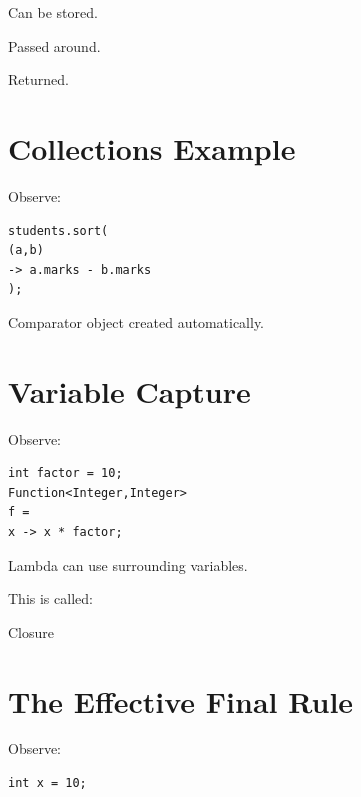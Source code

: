 \documentclass[11pt,a4paper]{book}
\begin{document}
Can be stored.


Passed around.


Returned.


\section{Collections Example}

Observe:

\begin{verbatim} 
students.sort(
(a,b)
-> a.marks - b.marks
);
\end{verbatim}


Comparator object created
automatically.


\section{Variable Capture}

Observe:

\begin{verbatim} 
int factor = 10;
Function<Integer,Integer>
f =
x -> x * factor;
\end{verbatim}


Lambda can use surrounding
variables.


This is called:


Closure


\section{The Effective Final Rule}

Observe:

\begin{verbatim} 
int x = 10;
\end{verbatim}
\end{document}
